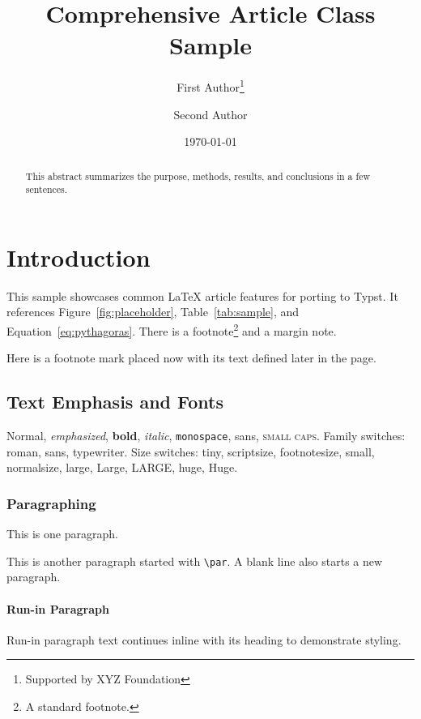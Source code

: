 \documentclass[titlepage,a4paper,12pt]{article}
\title{Comprehensive Article Class Sample}
\author{First Author\thanks{Supported by XYZ Foundation} \and Second Author}
\date{\today}
\begin{document}
\maketitle

\begin{abstract}
  This abstract summarizes the purpose, methods, results, and conclusions in a few sentences.
\end{abstract}

\tableofcontents
\listoffigures
\listoftables
\clearpage
{}

\section{Introduction}
This sample showcases common \LaTeX{} article features for porting to Typst. It references Figure~\ref{fig:placeholder}, Table~\ref{tab:sample}, and Equation~\eqref{eq:pythagoras}. There is a footnote\footnote{A standard footnote.} and a margin note.

Here is a footnote mark placed now\footnotemark{} with its text defined later in the page.

\subsection{Text Emphasis and Fonts}
Normal, \emph{emphasized}, \textbf{bold}, \textit{italic}, \texttt{monospace}, \textsf{sans}, \textsc{small caps}.
Family switches: {\rmfamily roman}, {\sffamily sans}, {\ttfamily typewriter}.
Size switches: {\tiny tiny}, {\scriptsize scriptsize}, {\footnotesize footnotesize}, {\small small}, {\normalsize normalsize}, {\large large}, {\Large Large}, {\LARGE LARGE}, {\huge huge}, {\Huge Huge}.

\subsubsection{Paragraphing}
This is one paragraph. \par
This is another paragraph started with \verb|\par|. A blank line also starts a new paragraph.

\paragraph{Run-in Paragraph}
Run-in paragraph text continues inline with its heading to demonstrate styling.
\end{document}
